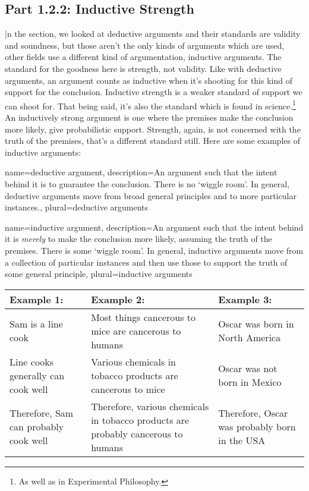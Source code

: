 \subsection{Part 1.2.2: Inductive Strength}
\label{s:p1.2.2}

|n the section, we looked at deductive arguments and their standards are validity and soundness, but those aren't the only kinds of arguments which are used, other fields use a different kind of argumentation, \glspl{inductive argument}. The standard for the goodness here is strength, not validity. Like with deductive arguments, an argument counts as inductive when it's shooting for this kind of support for the conclusion. Inductive strength is a weaker standard of support we can shoot for. That being said, it's also the standard which is found in science.\footnote{As well as in Experimental Philosophy.} An inductively strong argument is one where the premises make the conclusion more likely, give probabilistic support. Strength, again, is not concerned with the truth of the premises, that's a different standard still. Here are some examples of inductive arguments:

{
name=deductive argument,
description={An argument such that the intent behind it is to guarantee the conclusion. There is no ‘wiggle room'. In general, deductive arguments move from broad general principles and to more particular instances.},
plural=deductive arguments
}

{
name=inductive argument,
description={An argument such that the intent behind it is \emph{merely} to make the conclusion more likely, assuming the truth of the premises. There is some ‘wiggle room'. In general, inductive arguments move from a collection of particular instances and then use those to support the truth of some general principle},
plural=inductive arguments
}


\begin{tabular}{p{1in}|p{1in}|p{1in}}
Example 1: &Example 2: &Example 3:\\\hline
Sam is a line cook &Most things cancerous to mice are cancerous to humans &Oscar was born in North America\\
Line cooks generally can cook well &Various chemicals in tobacco products are cancerous to mice &Oscar was not born in Mexico\\
Therefore, Sam can probably cook well &Therefore, various chemicals in tobacco products are probably cancerous to humans &Therefore, Oscar was probably born in the USA
\end{tabular}

